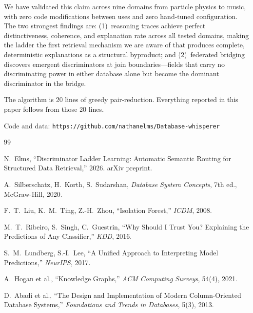 \documentclass[11pt]{article}
\begin{document}
We have validated this claim across nine domains from particle physics to music, with zero code modifications between uses and zero hand-tuned configuration. The two strongest findings are: (1)~reasoning traces achieve perfect distinctiveness, coherence, and explanation rate across all tested domains, making the ladder the first retrieval mechanism we are aware of that produces complete, deterministic explanations as a structural byproduct; and (2)~federated bridging discovers emergent discriminators at join boundaries---fields that carry no discriminating power in either database alone but become the dominant discriminator in the bridge.

The algorithm is 20 lines of greedy pair-reduction. Everything reported in this paper follows from those 20 lines.

Code and data: \texttt{https://github.com/nathanelms/Database-whisperer}

\begin{thebibliography}{99}

N.~Elms, ``Discriminator Ladder Learning: Automatic Semantic Routing for Structured Data Retrieval,'' 2026. arXiv preprint.

A.~Silberschatz, H.~Korth, S.~Sudarshan, \textit{Database System Concepts}, 7th ed., McGraw-Hill, 2020.

F.~T.~Liu, K.~M.~Ting, Z.-H.~Zhou, ``Isolation Forest,'' \textit{ICDM}, 2008.

M.~T.~Ribeiro, S.~Singh, C.~Guestrin, ``Why Should I Trust You? Explaining the Predictions of Any Classifier,'' \textit{KDD}, 2016.

S.~M.~Lundberg, S.-I.~Lee, ``A Unified Approach to Interpreting Model Predictions,'' \textit{NeurIPS}, 2017.

A.~Hogan et al., ``Knowledge Graphs,'' \textit{ACM Computing Surveys}, 54(4), 2021.

D.~Abadi et al., ``The Design and Implementation of Modern Column-Oriented Database Systems,'' \textit{Foundations and Trends in Databases}, 5(3), 2013.

\end{thebibliography}
\end{document}
